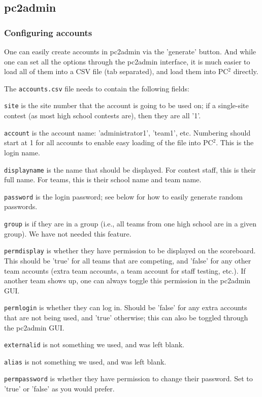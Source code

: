 \subsection{pc2admin}

\subsubsection{Configuring accounts}

One can easily create accounts in pc2admin via the 'generate' button.
And while one can set all the options through the pc2admin interface,
it is much easier to load all of them into a CSV file (tab separated),
and load them into PC$^2$ directly.

The {\tt accounts.csv} file needs to contain the following fields:

\begin{itemlist}
\item {\tt site} is the site number that the account is going to be
used on; if a single-site contest (as most high school contests are),
then they are all '1'.
\item {\tt account} is the account name: 'administrator1', 'team1',
etc.  Numbering should start at 1 for all accounts to enable easy
loading of the file into PC$^2$.  This is the login name.
\item {\tt displayname} is the name that should be displayed.  For
contest staff, this is their full name.  For teams, this is their
school name and team name.
\item {\tt password} is the login password; see below for how to
easily generate random passwords.
\item {\tt group} is if they are in a group (i.e., all teams from one
high school are in a given group).  We have not needed this feature.
\item {\tt permdisplay} is whether they have permission to be
displayed on the scoreboard.  This should be 'true' for all teams that
are competing, and 'false' for any other team accounts (extra team
accounts, a team account for staff testing, etc.).  If another team
shows up, one can always toggle this permission in the pc2admin GUI.
\item {\tt permlogin} is whether they can log in.  Should be 'false'
for any extra accounts that are not being used, and 'true' otherwise;
this can also be toggled through the pc2admin GUI.
\item {\tt externalid} is not something we used, and was left blank.
\item {\tt alias} is not something we used, and was left blank.
\item {\tt permpassword} is whether they have permission to change
their password.  Set to 'true' or 'false' as you would prefer.
\end{itemlist}

